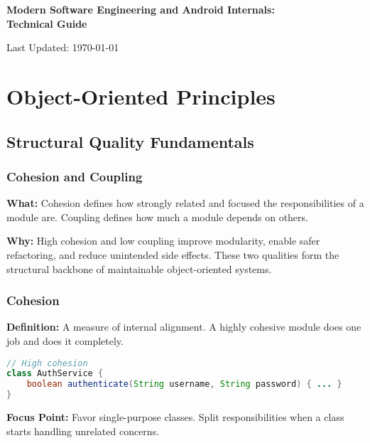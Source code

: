 \documentclass[a4paper,12pt]{article}
\begin{document}
\begin{titlepage}
  \centering
  \vspace*{3cm}
  {\Huge \bfseries Modern Software Engineering and Android Internals: \\[0.5em]
  Technical Guide \par}
  \vspace{5cm}
  \vfill
  {\large Last Updated: \today\par}
\end{titlepage}

\clearpage
\tableofcontents
\clearpage
{}

\section{Object-Oriented Principles}

\subsection{Structural Quality Fundamentals}
\subsubsection{Cohesion and Coupling}

\textbf{What:} Cohesion defines how strongly related and focused the responsibilities of a module are. Coupling defines how much a module depends on others.

\textbf{Why:} High cohesion and low coupling improve modularity, enable safer refactoring, and reduce unintended side effects. These two qualities form the structural backbone of maintainable object-oriented systems.

\subsubsection{Cohesion}

\textbf{Definition:} A measure of internal alignment. A highly cohesive module does one job and does it completely.

\begin{lstlisting}[language=Java]
// High cohesion
class AuthService {
    boolean authenticate(String username, String password) { ... }
}
\end{lstlisting}

\textbf{Focus Point:} Favor single-purpose classes. Split responsibilities when a class starts handling unrelated concerns.
\end{document}

